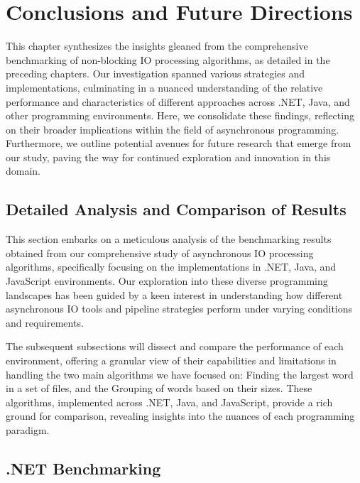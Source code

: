

\chapter{Conclusions and Future Directions}
\label{cha:conclusions_future_directions}
This chapter synthesizes the insights gleaned from the comprehensive benchmarking of non-blocking IO processing algorithms, as detailed in the preceding chapters. Our investigation spanned various strategies and implementations, culminating in a nuanced understanding of the relative performance and characteristics of different approaches across .NET, Java, and other programming environments. Here, we consolidate these findings, reflecting on their broader implications within the field of asynchronous programming. Furthermore, we outline potential avenues for future research that emerge from our study, paving the way for continued exploration and innovation in this domain.



\section{Detailed Analysis and Comparison of Results}
This section embarks on a meticulous analysis of the benchmarking results obtained from our comprehensive study of asynchronous IO processing algorithms, specifically focusing on the implementations in .NET, Java, and JavaScript environments. Our exploration into these diverse programming landscapes has been guided by a keen interest in understanding how different asynchronous IO tools and pipeline strategies perform under varying conditions and requirements.

The subsequent subsections will dissect and compare the performance of each environment, offering a granular view of their capabilities and limitations in handling the two main algorithms we have focused on: Finding the largest word in a set of files, and the Grouping of words based on their sizes. These algorithms, implemented across .NET, Java, and JavaScript, provide a rich ground for comparison, revealing insights into the nuances of each programming paradigm.



\section{.NET Benchmarking}
\label{sec:dotnet_implementation}

